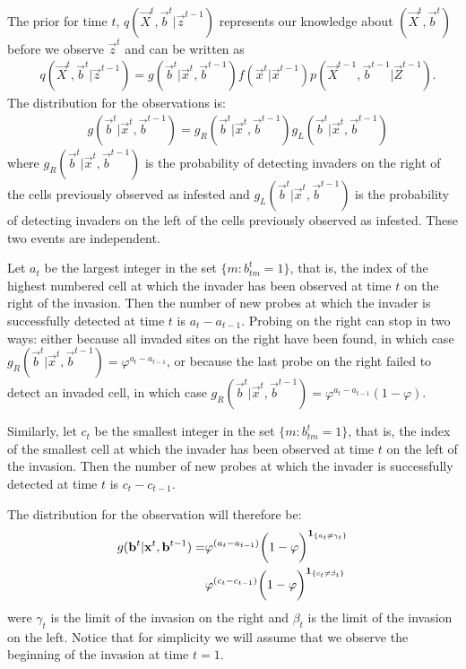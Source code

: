 The prior for time $t$, $q(\vec{X}^{t}, \vec{b}^t | \vec{z}^{t-1})$ represents our knowledge about $(\vec{X}^{t}, \vec{b}^t)$ before we observe $\vec{z}^{t}$ and can be written as
\begin{align}
    & q(\vec{X}^{t}, \vec{b}^{t} | \vec{z}^{t-1}) = g(\vec{b}^{t} | \vec{x}^{t}, \vec{b}^{t-1}) f(\vec{x}^{t} | \vec{x}^{t-1}) p(\vec{X}^{t-1}, \vec{b}^{t-1} | \vec{Z}^{t-1}). \label{eq:3}
\end{align}
The distribution for the observations is:
\begin{align*}
    & g(\vec{b}^{t} | \vec{x}^{t}, \vec{b}^{t-1}) = g_R(\vec{b}^{t} | \vec{x}^{t}, \vec{b}^{t-1}) g_L(\vec{b}^{t} | \vec{x}^{t}, \vec{b}^{t-1})
\end{align*}
where $g_R(\vec{b}^{t} | \vec{x}^{t}, \vec{b}^{t-1})$ is the probability of detecting invaders on the right of the cells previously observed as infested and $g_L(\vec{b}^{t} | \vec{x}^{t}, \vec{b}^{t-1})$ is the probability of detecting invaders on the left of the cells previously observed as infested. These two events are independent.

Let $a_{t}$ be the largest integer in the set $\{ m : b_{tm}^{t} = 1 \}$, that is, the index of the highest numbered cell at which the invader has been observed at time $t$ on the right of the invasion. Then the number of new probes at which the invader is successfully detected at time $t$ is $a_{t} - a_{t-1}$. Probing on the right can stop in two ways: either because all invaded sites on the right have been found, in which case $g_R(\vec{b}^{t} | \vec{x}^{t}, \vec{b}^{t-1}) = \varphi^{a_{t} - a_{t-1}}$, or because the last probe on the right failed to detect an invaded cell, in which case $g_R(\vec{b}^{t} | \vec{x}^{t}, \vec{b}^{t-1}) = \varphi^{a_{t} - a_{t-1}} (1 - \varphi)$.

Similarly, let $c_{t}$ be the smallest integer in the set $\{ m : b_{tm}^{t} = 1 \}$, that is, the index of the smallest cell at which the invader has been observed at time $t$ on the left of the invasion. Then the number of new probes at which the invader is successfully detected at time $t$ is $c_{t} - c_{t-1}$.

The distribution for the observation will therefore be:
\begin{align*}
    g(\mathbf{b}^{t} | \mathbf{x}^{t}, \mathbf{b}^{t-1}) = &\varphi^{(a_{t} - a_{t-1})} \bigg(1 - \varphi \bigg)^{\mathbf{1}_{\{a_{t} \neq \gamma_{t}\}}}\\
    &\varphi^{(c_{t} - c_{t-1})} \bigg( 1 - \varphi \bigg)^{\mathbf{1}_{\{c_{t} \neq \beta_{t}\}}}
\end{align*}
were $\gamma_{t}$ is the limit of the invasion on the right and $\beta_{t}$ is the limit of the invasion on the left. Notice that for simplicity we will assume that we observe the beginning of the invasion at time $t=1$. 

